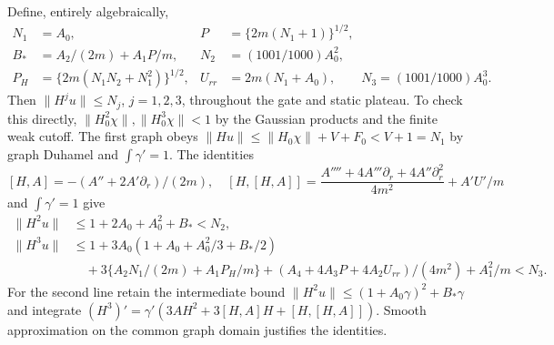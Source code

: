 \documentclass[11pt]{article}
\theoremstyle{definition}\newtheorem{definition}[theorem]{Definition}
\theoremstyle{remark}\newtheorem{remark}[theorem]{Remark}
\begin{document}
Define, entirely algebraically,
\begin{align*}
 N_1&=A_0, & P&=\{2m(N_1+1)\}^{1/2},\\
 B_*&=A_2/(2m)+A_1P/m,& N_2&=(1001/1000)A_0^2,\\
 P_H&=\{2m(N_1N_2+N_1^2)\}^{1/2},&
 U_{rr}&=2m(N_1+A_0),\qquad N_3=(1001/1000)A_0^3.
\end{align*}
Then $\|H^j u\|\leq N_j$, $j=1,2,3$, throughout the gate and static
plateau. To check this directly, $\|H_0^2\chi\|,\|H_0^3\chi\|<1$
by the Gaussian products and the finite weak cutoff. The first graph obeys
$\|H u\|\leq\|H_0\chi\|+V+F_0<V+1=N_1$ by graph Duhamel
and $\int\gamma'=1$. The identities
\[
 [H,A]=-(A''+2A'\partial_r)/(2m),\quad
 [H,[H,A]]=\frac{A''''+4A'''\partial_r+4A''\partial_r^2}{4m^2}
                                      +A'U'/m
\]
and $\int\gamma'=1$ give
\begin{align*}
 \|H^2u\|&\leq1+2A_0+A_0^2+B_*<N_2,\\
 \|H^3u\|&\leq1+3A_0(1+A_0+A_0^2/3+B_*/2)\\
 &\quad+3\{A_2N_1/(2m)+A_1P_H/m\}
       +(A_4+4A_3P+4A_2U_{rr})/(4m^2)+A_1^2/m<N_3.
\end{align*}
For the second line retain the intermediate bound
$\|H^2u\|\leq(1+A_0\gamma)^2+B_*\gamma$ and integrate
$(H^3)'=\gamma'(3AH^2+3[H,A]H+[H,[H,A]])$.
Smooth approximation on the common graph domain justifies the identities.
\end{document}
